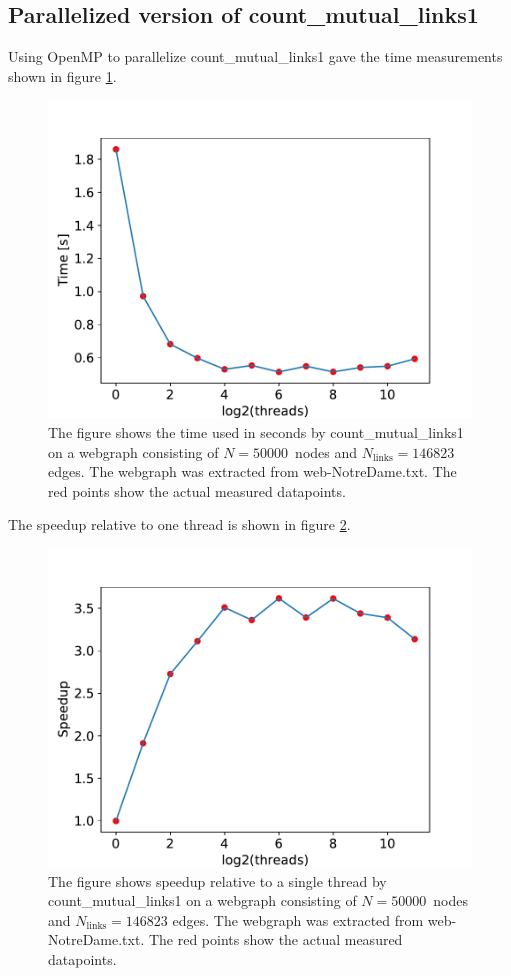 \documentclass[english,notitlepage, reprint]{revtex4-1}  %
\begin{document}
\subsection*{Parallelized version of count\_mutual\_links1}
Using OpenMP to parallelize count\_mutual\_links1 gave the time measurements shown in figure \ref{fig:count_mutual_links1_parallel}.
\begin{figure}[H]
    \centering
    \includegraphics[scale = 0.5]{count_mutual_links1_parallel.pdf}
    \caption{The figure shows the time used  in seconds by count\_mutual\_links1 on a webgraph consisting of $N = 50000$ nodes and $N_\text{links} = 146823$ edges. The webgraph was extracted from web-NotreDame.txt. The red points show the actual measured datapoints.}\label{fig:count_mutual_links1_parallel}
\end{figure}
The speedup relative to one thread is shown in figure \ref{fig:count_mutual_links1_speedup}.
\begin{figure}[H]
    \centering
    \includegraphics[scale = 0.5]{count_mutual_links1_speedup.pdf}
    \caption{The figure shows speedup relative to a single thread by count\_mutual\_links1 on a webgraph consisting of $N = 50000$ nodes and $N_\text{links} = 146823$ edges. The webgraph was extracted from web-NotreDame.txt. The red points show the actual measured datapoints.}\label{fig:count_mutual_links1_speedup}
\end{figure}
\end{document}
